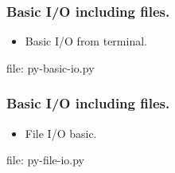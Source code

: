 
\begin{frame}[fragile]
\frametitle{Basic I/O including files.}
\newcommand{\newfilename}{py-basic-io.py}
\begin{itemize}
\item Basic I/O from terminal.

\end{itemize}
file: \newfilename
\end{frame}

\begin{frame}[fragile]
\frametitle{Basic I/O including files.}
\newcommand{\newfilename}{py-file-io.py}
\begin{itemize}
\item File I/O basic.

\end{itemize}
file: \newfilename
\end{frame}
